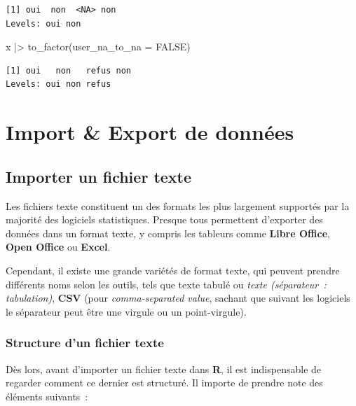 \documentclass[
  letterpaper,
  DIV=11,
  numbers=noendperiod,
  oneside]{scrreprt}
\newenvironment{Shaded}{\begin{snugshade}}{\end{snugshade}}
\newcommand{\AttributeTok}[1]{\textcolor[rgb]{0.40,0.45,0.13}{#1}}
\newcommand{\ConstantTok}[1]{\textcolor[rgb]{0.56,0.35,0.01}{#1}}
\newcommand{\FunctionTok}[1]{\textcolor[rgb]{0.28,0.35,0.67}{#1}}
\newcommand{\NormalTok}[1]{\textcolor[rgb]{0.00,0.23,0.31}{#1}}
\newcommand{\SpecialCharTok}[1]{\textcolor[rgb]{0.37,0.37,0.37}{#1}}
\begin{document}
\begin{verbatim}
[1] oui  non  <NA> non 
Levels: oui non
\end{verbatim}

\begin{Shaded}
\begin{Highlighting}[]
\NormalTok{x }\SpecialCharTok{|\textgreater{}}
  \FunctionTok{to\_factor}\NormalTok{(}\AttributeTok{user\_na\_to\_na =} \ConstantTok{FALSE}\NormalTok{)}
\end{Highlighting}
\end{Shaded}

\begin{verbatim}
[1] oui   non   refus non  
Levels: oui non refus
\end{verbatim}

\hypertarget{sec-import-export}{%
\chapter{Import \& Export de données}\label{sec-import-export}}

\hypertarget{importer-un-fichier-texte}{%
\section{Importer un fichier texte}\label{importer-un-fichier-texte}}

Les fichiers texte constituent un des formats les plus largement
supportés par la majorité des logiciels statistiques. Presque tous
permettent d'exporter des données dans un format texte, y compris les
tableurs comme \textbf{Libre Office}, \textbf{Open Office} ou
\textbf{Excel}.

Cependant, il existe une grande variétés de format texte, qui peuvent
prendre différents noms selon les outils, tels que texte tabulé ou
\emph{texte (séparateur~: tabulation)}, \textbf{CSV} (pour
\emph{comma-separated value}, sachant que suivant les logiciels le
séparateur peut être une virgule ou un point-virgule).

\hypertarget{structure-dun-fichier-texte}{%
\subsection{Structure d'un fichier
texte}\label{structure-dun-fichier-texte}}

Dès lors, avant d'importer un fichier texte dans \textbf{R}, il est
indispensable de regarder comment ce dernier est structuré. Il importe
de prendre note des éléments suivants~:
\end{document}
